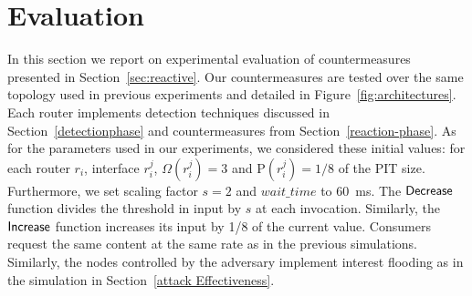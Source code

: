 \documentclass[10pt,conference,letterpaper]{IEEEtran}
\newcommand{\Rho}{\mathrm{P}}
\begin{document}
  
\begin{comment}
Threshold of PIT usages is set to $1/8$ of PIT size; Threshold of rate are set to 3.0.

In this case, router drops packet coming from that interface until rate or PIT usage comes back the threshold.

In the push back when a router detects an attack it sends an alert packet to the interface that generates the attack detection. When a router receives an alert packet it reduces rate threshold by 0.5 and cuts by half PIT usage threshold. After a stationary time, where no other alert packets are received, a router increments rate threshold by $1/8*rate \ \ base$ and PIT usage threshold by factor $1/8*PIT \ \ usage \ \ threshold \ \ base$ both at every microsecond (maybe this value has to be changed). Incrementation phase lasts until thresholds reach base values.
\end{comment}



\begin{comment}
\subsection{Local countermeasure}
\label{local}

The second phase, called Reaction phase, has the purpose to reduce the impact of the attack over the network. A router, that detect an attack on a interface \textit{i}, acts as a filter so that interests coming from it have not the behavior of an attack. To obtain this behavior, when a router detect an attack, simply drops packets until $\omega(r_i^j, t_k)$ or $\rho(r_i^j, t_k)$ back below the bound.
\end{comment}









\section{Evaluation}
\label{sec:evaluation}

In this section we report on experimental evaluation of countermeasures presented in Section~\ref{sec:reactive}.
Our countermeasures are tested over the same topology used in previous experiments and detailed in Figure~\ref{fig:architectures}. Each router implements detection techniques discussed in Section~\ref{detectionphase} and countermeasures from Section~\ref{reaction-phase}.
As for the parameters used in our experiments, we considered these initial values: for each router $r_i$, interface $r_i^j$, $\Omega(r_i^j)=3$ and $\Rho(r_i^j)=1/8$ of the PIT size. 
Furthermore, we set scaling factor $s=2$ and $wait\_time$ to $60$~ms. 
The $\sf Decrease$ function divides the threshold in input by $s$ at each invocation. Similarly, the $\sf Increase$ function increases its input by 1/8 of the current value.
Consumers request the same content at the same rate as in the previous simulations. Similarly, the nodes controlled by the adversary implement interest flooding as in the simulation in Section~\ref{attack Effectiveness}. 
\end{document}
